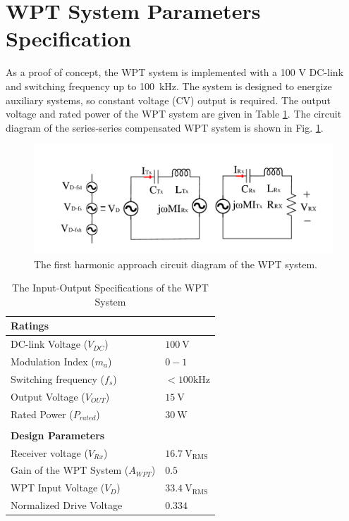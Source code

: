 \documentclass[journal]{IEEEtran}
\begin{document}
\section{WPT System Parameters Specification}
As a proof of concept, the WPT system is implemented with a 100 V DC-link and switching frequency up to 100~kHz. 
The system is designed to energize auxiliary systems, so constant voltage (CV) output is required. The output voltage and rated power of the WPT system are given in Table \ref{tab:WPT_ratings}. 
The circuit diagram of the series-series compensated WPT system is shown in Fig. \ref{fig:WPT_system}. 
\begin{figure}[h!]
    \centering
    \includegraphics[width=1\linewidth]{FHA.pdf}
    \caption{The first harmonic approach circuit diagram of the WPT system.}
    \label{fig:WPT_system}
\end{figure}
\begin{table}[h!]
\centering
\caption{The Input-Output Specifications of the WPT System}
\label{tab:WPT_ratings}
\begin{tabular}{ll}
\textbf{Ratings}  &    \\ \hline
DC-link Voltage ($V_{DC}$)    & $\mathrm{100~V}$ \\
Modulation Index  ($m_a$)  & $\mathrm{0-1}$ \\
Switching frequency  ($f_s$)  & $\mathrm{<100kHz}$ \\
Output Voltage    ($V_{OUT}$)   & $\mathrm{15~V}$ \\
Rated Power      ($P_{rated}$)     & $\mathrm{30~W}$ \\
\hline
\hline
\\
\textbf{Design Parameters}  &    \\ \hline
Receiver voltage ($V_{Rx}$) & $\mathrm{16.7~V_{RMS}}$ \\
Gain of the WPT System  ($A_{WPT}$)  & $\mathrm{0.5}$ \\
WPT Input Voltage  ($V_{D}$)  & $\mathrm{33.4~V_{RMS}}$ \\
Normalized Drive Voltage   & $\mathrm{0.334}$ \\
\end{tabular}
\end{table}
\end{document}
